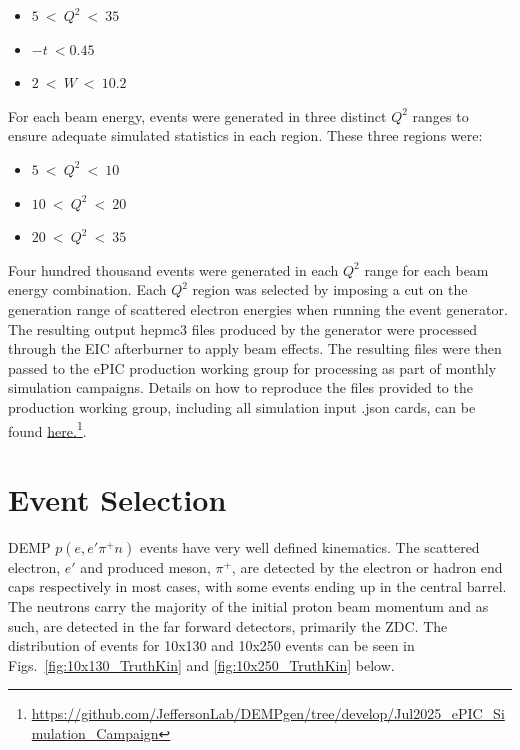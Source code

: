 \documentclass[letterpaper,12pt]{article}
\begin{document}
\begin{itemize}
    \item $5~<~Q^{2}~<~35$
    \item $-t~<0.45$
    \item $2~<~W~<~10.2$
\end{itemize}

For each beam energy, events were generated in three distinct $Q^{2}$ ranges to ensure adequate simulated statistics in each region. These three regions were:

\begin{itemize}
    \item $5~<~Q^{2}~<~10$
    \item $10~<~Q^{2}~<~20$
    \item $20~<~Q^{2}~<~35$
\end{itemize}

Four hundred thousand events were generated in each $Q^{2}$ range for each beam energy combination. Each $Q^{2}$ region was selected by imposing a cut on the generation range of scattered electron energies when running the event generator. The resulting output hepmc3 files produced by the generator were processed through the EIC afterburner \cite{Afterburner} to apply beam effects. The resulting files were then passed to the ePIC production working group for processing as part of monthly simulation campaigns. Details on how to reproduce the files provided to the production working group, including all simulation input .json cards, can be found \href{https://github.com/JeffersonLab/DEMPgen/tree/develop/Jul2025_ePIC_Simulation_Campaign}{here.}\footnote{\url{https://github.com/JeffersonLab/DEMPgen/tree/develop/Jul2025_ePIC_Simulation_Campaign}}.

\section{Event Selection}\label{sec:EvSelect}

DEMP $p(e,e'\pi^+n)$ events have very well defined kinematics. The scattered electron, $e'$ and produced meson, $\pi^{+}$, are detected by the electron or hadron end caps respectively in most cases, with some events ending up in the central barrel. The neutrons carry the majority of the initial proton beam momentum and as such, are detected in the far forward detectors, primarily the ZDC. The distribution of events for 10x130 and 10x250 events can be seen in Figs.~\ref{fig:10x130_TruthKin} and \ref{fig:10x250_TruthKin} below.
\end{document}

